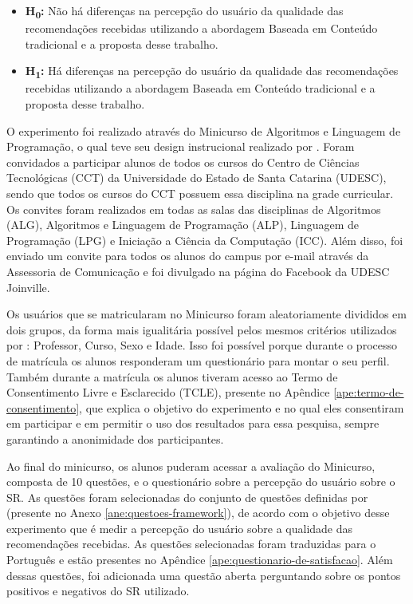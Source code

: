 \begin{itemize}
\item \textbf{H\textsubscript{0}:} Não há diferenças na percepção do usuário da qualidade das recomendações recebidas utilizando a abordagem
Baseada em Conteúdo tradicional e a proposta desse trabalho.
\item \textbf{H\textsubscript{1}:} Há diferenças na percepção do usuário da qualidade das recomendações recebidas utilizando a abordagem
Baseada em Conteúdo tradicional e a proposta desse trabalho.
\end{itemize}

O experimento foi realizado através do Minicurso de Algoritmos e Linguagem de Programação, o qual teve seu design
instrucional realizado por . Foram convidados a participar alunos de todos os cursos do
Centro de Ciências Tecnológicas (CCT) da Universidade do Estado de Santa Catarina (UDESC), sendo que todos os cursos do
CCT possuem essa disciplina na grade curricular. Os convites foram realizados em todas as salas das disciplinas de
Algoritmos (ALG), Algoritmos e Linguagem de Programação (ALP), Linguagem de Programação (LPG) e Iniciação a Ciência da
Computação (ICC). Além disso, foi enviado um convite para todos os alunos do campus por e-mail através da Assessoria de
Comunicação e foi divulgado na página do Facebook da UDESC Joinville.

Os usuários que se matricularam no Minicurso foram aleatoriamente divididos em dois grupos, da forma mais igualitária possível
pelos mesmos critérios utilizados por : Professor, Curso, Sexo e Idade. Isso foi possível
porque durante o processo de matrícula os alunos responderam um questionário para montar o seu perfil. Também durante a
matrícula os alunos tiveram acesso ao Termo de Consentimento Livre e Esclarecido (TCLE), presente no Apêndice
\ref{ape:termo-de-consentimento}, que explica o objetivo do experimento e no qual eles consentiram em participar e em
permitir o uso dos resultados para essa pesquisa, sempre garantindo a anonimidade dos participantes.

Ao final do minicurso, os alunos puderam acessar a avaliação do Minicurso, composta de 10 questões, e o questionário
sobre a percepção do usuário sobre o SR. As questões foram selecionadas do
conjunto de questões definidas por  (presente no Anexo \ref{ane:questoes-framework}), de acordo
com o objetivo desse experimento que é medir a percepção do usuário sobre a qualidade das recomendações recebidas.
As questões selecionadas foram traduzidas para o Português e estão presentes no Apêndice \ref{ape:questionario-de-satisfacao}.
Além dessas questões, foi adicionada uma questão aberta perguntando sobre os pontos positivos e negativos do SR utilizado.

